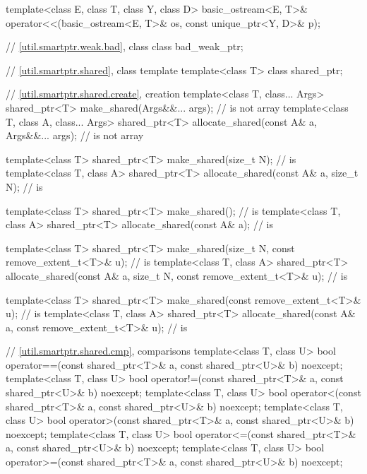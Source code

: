 \begin{codeblock}
{  template<class E, class T, class Y, class D>
    basic_ostream<E, T>& operator<<(basic_ostream<E, T>& os, const unique_ptr<Y, D>& p);

  // \ref{util.smartptr.weak.bad}, class 
  class bad_weak_ptr;

  // \ref{util.smartptr.shared}, class template 
  template<class T> class shared_ptr;

  // \ref{util.smartptr.shared.create},  creation
  template<class T, class... Args>
    shared_ptr<T> make_shared(Args&&... args);                                  //  is not array
  template<class T, class A, class... Args>
    shared_ptr<T> allocate_shared(const A& a, Args&&... args);                  //  is not array

  template<class T>
    shared_ptr<T> make_shared(size_t N);                                        //  is 
  template<class T, class A>
    shared_ptr<T> allocate_shared(const A& a, size_t N);                        //  is 

  template<class T>
    shared_ptr<T> make_shared();                                                //  is 
  template<class T, class A>
    shared_ptr<T> allocate_shared(const A& a);                                  //  is 

  template<class T>
    shared_ptr<T> make_shared(size_t N, const remove_extent_t<T>& u);           //  is 
  template<class T, class A>
    shared_ptr<T> allocate_shared(const A& a, size_t N,
                                  const remove_extent_t<T>& u);                 //  is 

  template<class T> shared_ptr<T>
    make_shared(const remove_extent_t<T>& u);                                   //  is 
  template<class T, class A>
    shared_ptr<T> allocate_shared(const A& a, const remove_extent_t<T>& u);     //  is 

  // \ref{util.smartptr.shared.cmp},  comparisons
  template<class T, class U>
    bool operator==(const shared_ptr<T>& a, const shared_ptr<U>& b) noexcept;
  template<class T, class U>
    bool operator!=(const shared_ptr<T>& a, const shared_ptr<U>& b) noexcept;
  template<class T, class U>
    bool operator<(const shared_ptr<T>& a, const shared_ptr<U>& b) noexcept;
  template<class T, class U>
    bool operator>(const shared_ptr<T>& a, const shared_ptr<U>& b) noexcept;
  template<class T, class U>
    bool operator<=(const shared_ptr<T>& a, const shared_ptr<U>& b) noexcept;
  template<class T, class U>
    bool operator>=(const shared_ptr<T>& a, const shared_ptr<U>& b) noexcept;

}
\end{codeblock}
